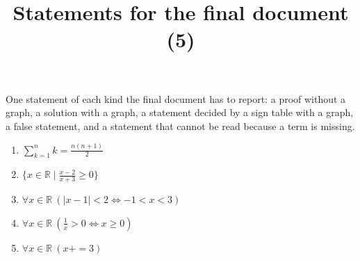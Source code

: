 \documentclass[11pt,a4paper]{article}
\title{Statements for the final document (5)}
\author{}
\date{}
\begin{document}
\maketitle
One statement of each kind the final document has to report: a proof without a graph, a solution with a graph, a statement decided by a sign table with a graph, a false statement, and a statement that cannot be read because a term is missing.

\begin{enumerate}
\item $\displaystyle \sum_{k=1}^{n} k = \frac{n(n+1)}{2}$
\item $\displaystyle \{x \in \mathbb{R} \mid \frac{x - 2}{x + 3} \ge 0\}$
\item $\displaystyle \forall x \in \mathbb{R}\ \left(\left|x - 1\right| < 2 \iff -1 < x < 3\right)$
\item $\displaystyle \forall x \in \mathbb{R}\ \left(\frac{1}{x} > 0 \iff x \ge 0\right)$
\item $\displaystyle \forall x \in \mathbb{R}\ (x + = 3)$
\end{enumerate}
\end{document}
